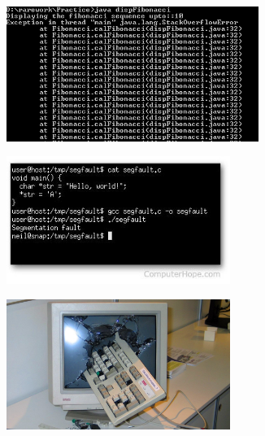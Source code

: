 \documentclass{beamer}
\begin{document}
\begin{frame}
\begin{figure}[t]
\begin{subfigure}[b]{0.3\textwidth}
    \end{subfigure}
  \end{figure}
  \pause
  \begin{figure}
    \begin{subfigure}[t]{0.3\textwidth}
      \includegraphics[width=0.9\textwidth]{images/stack-overflow.png}
    \end{subfigure}
    \pause
    \begin{subfigure}[t]{0.3\textwidth}
      \includegraphics[width=0.8\textwidth]{images/segfault.jpg}
    \end{subfigure}
    \pause
    \begin{subfigure}[t]{0.3\textwidth}
      \includegraphics[width=0.8\textwidth]{images/break-computer.jpg}
    \end{subfigure}
  \end{figure}
\end{frame}
\end{document}
